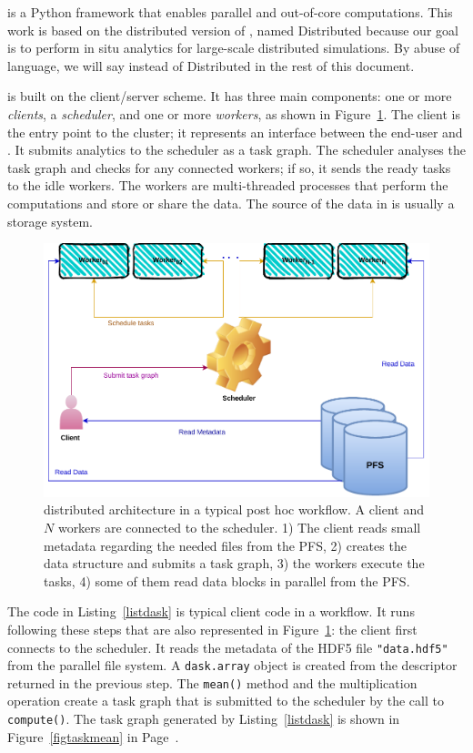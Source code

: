 \dask is a Python framework that enables parallel and out-of-core computations. This work is based on the distributed version of \dask, named \dask Distributed because our goal is to perform in situ analytics for large-scale distributed simulations.
By abuse of language, we will say \dask instead of \dask Distributed in the rest of this document. 

\dask is built on the client/server scheme. 
It has three main components: one or more \textit{clients}, a \textit{scheduler}, and one or more \textit{workers}, as shown in Figure~\ref{figdaskarchi}. 
The client is the entry point to the \dask cluster; it represents an interface between the end-user and \dask. It submits analytics to the scheduler as a task graph. 
The scheduler analyses the task graph and checks for any connected workers; if so, it sends the ready tasks to the idle workers. The workers are multi-threaded processes that perform the computations and store or share the data.
The source of the data in \dask is usually a storage system.

\begin{figure}[h!]\centering
\includegraphics[scale=0.6]{figures/DaskArchiecture.pdf}
\caption{\dask distributed architecture in a typical post hoc workflow. A client and $N$ workers are connected to the scheduler. 1) The client reads small metadata regarding the needed files from the PFS, 2) creates the \dask data structure and submits a task graph, 3) the workers execute the tasks, 4) some of them read data blocks in parallel from the PFS.}
\label{figdaskarchi}
\end{figure}

The code in Listing~\ref{listdask} is typical client code in a \dask workflow. It runs following these steps that are also represented in Figure~\ref{figdaskarchi}: 
the client first connects to the scheduler. 
It reads the metadata of the HDF5 file \texttt{"data.hdf5"} from the parallel file system. 
A \texttt{dask.array} object is created from the descriptor returned in the previous step. 
The \texttt{mean()} method and the multiplication operation create a task graph that is submitted to the scheduler by the call to \texttt{compute()}. The task graph generated by Listing~\ref{listdask} is shown in Figure~\ref{figtaskmean} in Page~\pageref{figtaskmean}. 

